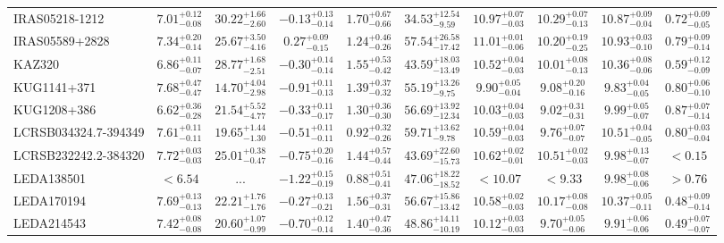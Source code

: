 \documentclass[onecolumn]{mn2e}
\begin{document}
\begin{landscape}
{\begin{center}
\begin{longtable}{lccccccccc}
IRAS05218-1212 & $7.01_{-0.08}^{+0.12}$ & $30.22_{-2.60}^{+1.66}$ & $-0.13_{-0.14}^{+0.13}$ & $1.70_{-0.66}^{+0.67}$ &$34.53_{-9.59}^{+12.54}$ & $10.97_{-0.03}^{+0.07}$ & $10.29_{-0.13}^{+0.07}$ & $10.87_{-0.04}^{+0.09}$ & $0.72_{-0.05}^{+0.09}$ \\
IRAS05589+2828 & $7.34_{-0.14}^{+0.20}$ & $25.67_{-4.16}^{+3.50}$ & $0.27_{-0.15}^{+0.09}$ & $1.24_{-0.26}^{+0.46}$ &$57.54_{-17.42}^{+26.58}$ & $11.01_{-0.06}^{+0.01}$ & $10.20_{-0.25}^{+0.19}$ & $10.93_{-0.10}^{+0.03}$ & $0.79_{-0.14}^{+0.09}$ \\
KAZ320 & $6.86_{-0.07}^{+0.11}$ & $28.77_{-2.51}^{+1.68}$ & $-0.30_{-0.14}^{+0.14}$ & $1.55_{-0.42}^{+0.53}$ &$43.59_{-13.49}^{+18.03}$ & $10.52_{-0.03}^{+0.04}$ & $10.01_{-0.13}^{+0.08}$ & $10.36_{-0.06}^{+0.08}$ & $0.59_{-0.09}^{+0.12}$ \\
KUG1141+371 & $7.68_{-0.47}^{+0.47}$ & $14.70_{-2.98}^{+4.04}$ & $-0.91_{-0.13}^{+0.11}$ & $1.39_{-0.32}^{+0.37}$ &$55.19_{-9.75}^{+13.26}$ & $9.90_{-0.04}^{+0.05}$ & $9.08_{-0.16}^{+0.20}$ & $9.83_{-0.05}^{+0.04}$ & $0.80_{-0.10}^{+0.06}$ \\
KUG1208+386 & $6.62_{-0.28}^{+0.36}$ & $21.54_{-4.77}^{+5.52}$ & $-0.33_{-0.17}^{+0.11}$ & $1.30_{-0.30}^{+0.36}$ &$56.69_{-12.34}^{+13.92}$ & $10.03_{-0.03}^{+0.04}$ & $9.02_{-0.31}^{+0.31}$ & $9.99_{-0.07}^{+0.05}$ & $0.87_{-0.14}^{+0.07}$ \\
LCRSB034324.7-394349 & $7.61_{-0.11}^{+0.11}$ & $19.65_{-1.30}^{+1.44}$ & $-0.51_{-0.11}^{+0.11}$ & $0.92_{-0.26}^{+0.32}$ &$59.71_{-9.78}^{+13.62}$ & $10.59_{-0.03}^{+0.04}$ & $9.76_{-0.07}^{+0.07}$ & $10.51_{-0.05}^{+0.04}$ & $0.80_{-0.04}^{+0.03}$ \\
LCRSB232242.2-384320 & $7.72_{-0.03}^{+0.03}$ & $25.01_{-0.47}^{+0.38}$ & $-0.75_{-0.16}^{+0.20}$ & $1.44_{-0.44}^{+0.57}$ &$43.69_{-15.73}^{+22.60}$ & $10.62_{-0.01}^{+0.02}$ & $10.51_{-0.03}^{+0.02}$ & $9.98_{-0.07}^{+0.13}$ & $<0.15$ \\
LEDA138501 & $<6.54$ & ... & $-1.22_{-0.19}^{+0.15}$ & $0.88_{-0.41}^{+0.51}$ &$47.06_{-18.52}^{+18.22}$ & $<10.07$ & $<9.33$ & $9.98_{-0.06}^{+0.08}$ & $>0.76$ \\
LEDA170194 & $7.69_{-0.13}^{+0.13}$ & $22.21_{-1.76}^{+1.76}$ & $-0.27_{-0.21}^{+0.13}$ & $1.56_{-0.31}^{+0.37}$ &$56.67_{-13.42}^{+15.86}$ & $10.58_{-0.03}^{+0.02}$ & $10.17_{-0.08}^{+0.08}$ & $10.37_{-0.11}^{+0.05}$ & $0.48_{-0.14}^{+0.09}$ \\
LEDA214543 & $7.42_{-0.08}^{+0.08}$ & $20.60_{-0.99}^{+1.07}$ & $-0.70_{-0.14}^{+0.12}$ & $1.40_{-0.36}^{+0.47}$ &$48.86_{-10.19}^{+14.11}$ & $10.12_{-0.03}^{+0.03}$ & $9.70_{-0.06}^{+0.05}$ & $9.91_{-0.06}^{+0.06}$ & $0.49_{-0.07}^{+0.07}$ \\

\end{longtable}
\end{center}}
\end{landscape}
\end{document}
